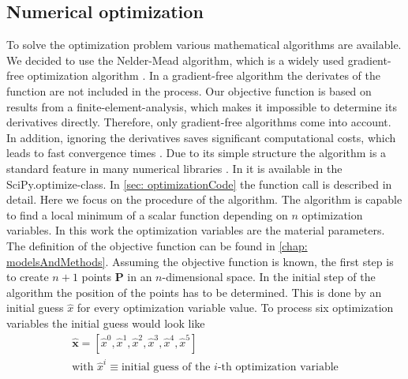 \subsection{Numerical optimization} \label{subsec: numericalOptimization}
To solve the optimization problem various mathematical algorithms are available. We decided to use the Nelder-Mead algorithm, which is a widely used gradient-free optimization algorithm \cite{gao_implementing_2012}. In a gradient-free algorithm the derivates of the function are not included in the process. Our objective function is based on results from a finite-element-analysis, which makes it impossible to determine its derivatives directly. Therefore, only gradient-free algorithms come into account. In addition, ignoring the derivatives saves significant computational costs, which leads to fast convergence times \cite{pham_comparative_2011}. Due to its simple structure the algorithm is a standard feature in many numerical libraries \cite{singer_efficient_2004}. In  it is available in the SciPy.optimize-class. In \autoref{sec: optimizationCode} the function call is described in detail. Here we focus on the procedure of the algorithm. The algorithm is capable to find a local minimum of a scalar function depending on $n$ optimization variables. In this work the optimization variables are the material parameters. The definition of the objective function can be found in \autoref{chap: modelsAndMethods}. Assuming the objective function is known, the first step is to create $n+1$ points $\mathbf{P}$ in an $n$-dimensional space. In the initial step of the algorithm the position of the points has to be determined. This is done by an initial guess $\hat{x}$ for every optimization variable value. To process six optimization variables the initial guess would look like
\begin{gather*}
    \mathbf{\hat{x}} = [\hat{x}^0, \hat{x}^1, \hat{x}^2, \hat{x}^3, \hat{x}^4, \hat{x}^5] \\
    \text{with } \hat{x}^i \equiv \text{initial guess of the $i$-th optimization variable}
\end{gather*}

